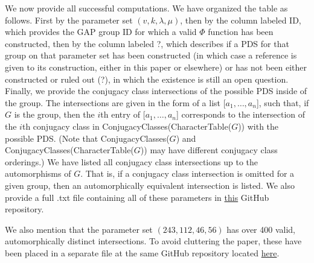 \documentclass[12pt]{amsproc} %
\theoremstyle{definition}\newtheorem{defn}[thm]{Definition}
\theoremstyle{definition}\newtheorem{rem}[thm]{Remark}
\theoremstyle{definition}\newtheorem{ex}[thm]{Example}
\begin{document}
\FloatBarrier



We now provide all successful computations. We have organized the table as follows. First by the parameter set $(v, k, \lambda, \mu)$, then by the column labeled ID, which provides the GAP \cite{GAP4} group ID for which a valid $\Phi$ function has been constructed, then by the column labeled ?, which describes if a PDS for that group on that parameter set has been constructed (in which case a reference is given to its construction, either in this paper or elsewhere) or has not been either constructed or ruled out (?), in which the existence is still an open question.  Finally, we provide the conjugacy class intersections of the possible PDS inside of the group. The intersections are given in the form of a list [$a_1, \dots, a_n$], such that, if $G$ is the group, then the $i$th entry of [$a_1, \dots, a_n$] corresponds to the intersection of the $i$th conjugacy class in ConjugacyClasses(CharacterTable($G$)) with the possible PDS.  (Note that ConjugacyClasses($G$) and ConjugacyClasses(CharacterTable($G$)) may have different conjugacy class orderings.) We have listed all conjugacy class intersections up to the automorphisms of $G$. That is, if a conjugacy class intersection is omitted for a given group, then an automorphically equivalent intersection is listed. We also provide a full .txt file containing all of these parameters in \href{https://github.com/srnelson1/PDS-class-intersections}{this} GitHub repository.

We also mention that the parameter set $(243, 112, 46, 56)$ has over 400 valid, automorphically distinct intersections. To avoid cluttering the paper, these have been placed in a separate file at the same GitHub repository located \href{https://github.com/srnelson1/PDS-class-intersections}{here}.
\end{document}
